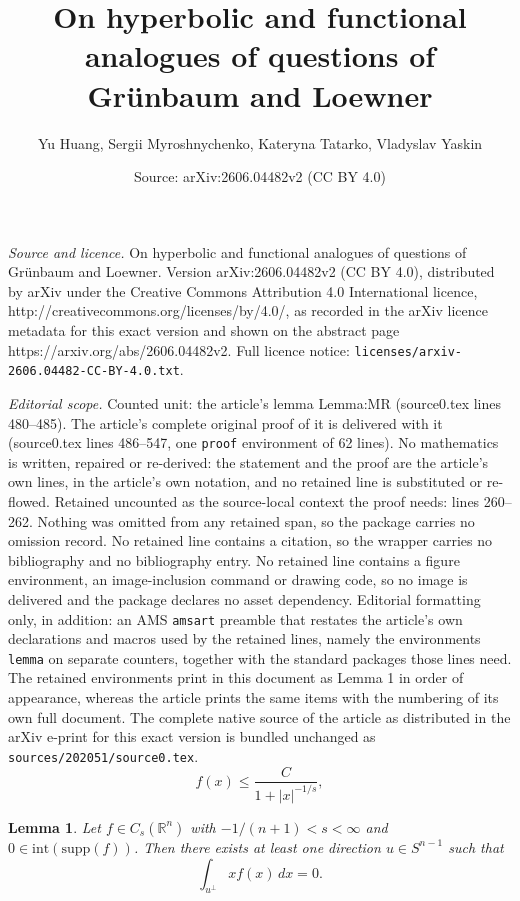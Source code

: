\documentclass[10pt,a4paper]{amsart}
\title{On hyperbolic and functional analogues of questions of Gr\"unbaum and Loewner}
\author{Yu Huang, Sergii Myroshnychenko, Kateryna Tatarko, Vladyslav Yaskin}
\date{Source: arXiv:2606.04482v2 (CC BY 4.0)}
\newtheorem{lemma}{Lemma}
\begin{document}
\maketitle

\noindent\emph{Source and licence.} On hyperbolic and functional analogues of questions of Gr\"unbaum and Loewner. Version arXiv:2606.04482v2 (CC BY 4.0), distributed by arXiv under the Creative Commons Attribution 4.0 International licence, http://creativecommons.org/licenses/by/4.0/, as recorded in the arXiv licence metadata for this exact version and shown on the abstract page https://arxiv.org/abs/2606.04482v2. Full licence notice: \texttt{licenses/arxiv-2606.04482-CC-BY-4.0.txt}.\par\smallskip

\noindent\textit{Editorial scope.} Counted unit: the article's lemma Lemma:MR (source0.tex lines 480--485). The article's complete original proof of it is delivered with it (source0.tex lines 486--547, one \texttt{proof} environment of 62 lines). No mathematics is written, repaired or re-derived: the statement and the proof are the article's own lines, in the article's own notation, and no retained line is substituted or re-flowed.  Retained uncounted as the source-local context the proof needs: lines 260--262.  Nothing was omitted from any retained span, so the package carries no omission record.  No retained line contains a citation, so the wrapper carries no bibliography and no bibliography entry.  No retained line contains a figure environment, an image-inclusion command or drawing code, so no image is delivered and the package declares no asset dependency.  Editorial formatting only, in addition: an AMS \texttt{amsart} preamble that restates the article's own declarations and macros used by the retained lines, namely the environments \texttt{lemma} on separate counters, together with the standard packages those lines need.  The retained environments print in this document as Lemma 1 in order of appearance, whereas the article prints the same items with the numbering of its own full document.  The complete native source of the article as distributed in the arXiv e-print for this exact version is bundled unchanged as \texttt{sources/202051/source0.tex}.
\begin{equation}\label{s-conc}
	f(x)\le \frac{C}{1+|x|^{-1/s}},
\end{equation}

			\begin{lemma}\label{Lemma:MR}
				Let  $f\in C_s(\mathbb R^n)$ with $-1/(n+1)<s<\infty$  and $0 \in \text{int}\left(\text{supp}(f)\right)$. Then there exists at least one direction $u \in S^{n-1}$ such that 
				$$
				\int_{u^\perp} x f(x) \, dx = 0.
				$$
			\end{lemma}
\end{document}

